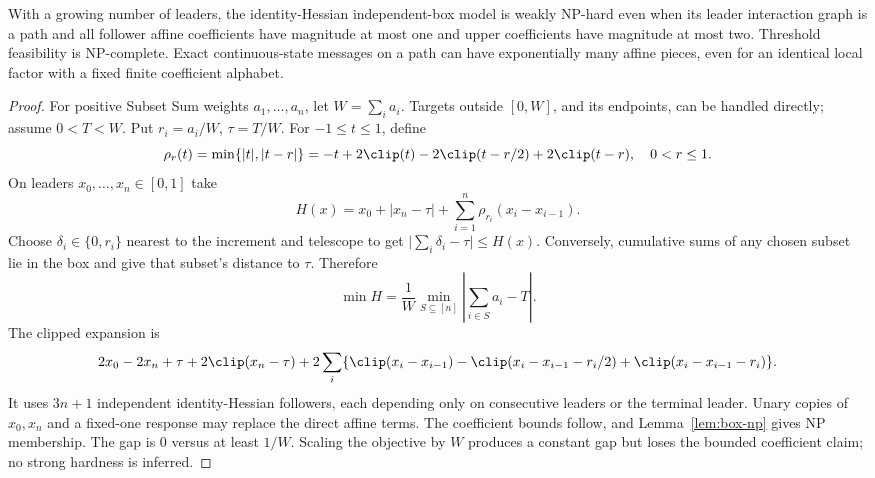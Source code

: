 \begin{theorem}\label{thm:leader-path}
With a growing number of leaders, the identity-Hessian independent-box model
is weakly NP-hard even when its leader interaction graph is a path and all
follower affine coefficients have magnitude at most one and upper coefficients
have magnitude at most two. Threshold feasibility is NP-complete. Exact
continuous-state messages on a path can have exponentially many affine pieces,
even for an identical local factor with a fixed finite coefficient alphabet.
\end{theorem}
\begin{proof}
For positive Subset Sum weights \(a_1,\ldots,a_n\), let \(W=\sum_i a_i\).
Targets outside \([0,W]\), and its endpoints, can be handled directly; assume
\(0<T<W\). Put \(r_i=a_i/W\), \(\tau=T/W\). For \(-1\le t\le1\), define
\[
 \rho_r(t)=\min\{|t|,|t-r|\}
 =-t+2\clip(t)-2\clip(t-r/2)+2\clip(t-r),\quad0<r\le1.
\]
On leaders \(x_0,\ldots,x_n\in[0,1]\) take
\[
 H(x)=x_0+|x_n-\tau|+\sum_{i=1}^n\rho_{r_i}(x_i-x_{i-1}).
\]
Choose \(\delta_i\in\{0,r_i\}\) nearest to the increment and telescope to get
\(\bigl|\sum_i\delta_i-\tau\bigr|\le H(x)\). Conversely, cumulative sums of
any chosen subset lie in the box and give that subset's distance to \(\tau\).
Therefore
\begin{equation}\label{eq:subset-path-distance}
 \min H=\frac1W\min_{S\subseteq[n]}\left|\sum_{i\in S}a_i-T\right|.
\end{equation}
The clipped expansion is
\[
 2x_0-2x_n+\tau+2\clip(x_n-\tau)+
 2\sum_i\{\clip(x_i-x_{i-1})-\clip(x_i-x_{i-1}-r_i/2)
                         +\clip(x_i-x_{i-1}-r_i)\}.
\]
It uses \(3n+1\) independent identity-Hessian followers, each depending only
on consecutive leaders or the terminal leader. Unary copies of \(x_0,x_n\)
and a fixed-one response may replace the direct affine terms. The coefficient
bounds follow, and Lemma~\ref{lem:box-np} gives NP membership. The gap is
\(0\) versus at least \(1/W\). Scaling the objective by \(W\) produces a
constant gap but loses the bounded coefficient claim; no strong hardness is
inferred.


\end{proof}
